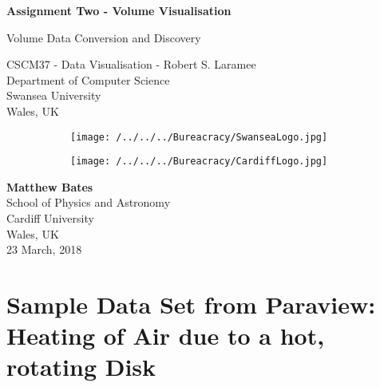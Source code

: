 \documentclass{article}
\author{Matthew Bates}
\begin{document}
\begin{titlepage}
    \begin{center}
        \vspace*{1cm}
        
	\Huge
        \textbf{Assignment Two - Volume Visualisation}
        
        \vspace{0.5cm}
	\LARGE
        Volume Data Conversion and Discovery
         \vfill

	CSCM37 - Data Visualisation - Robert S. Laramee\\
	Department of Computer Science\\
	Swansea University\\
 	Wales, UK
        \vspace{1.5cm}
	\begin{figure}[h]
    		\centering
    		\begin{subfigure}[b]{0.3\textwidth}
        		\texttt{[image: /../../../Bureacracy/SwanseaLogo.jpg]}
    		\end{subfigure}
		\begin{subfigure}[b]{0.215\textwidth}
        		\texttt{[image: /../../../Bureacracy/CardiffLogo.jpg]}
        	\end{subfigure}
	\end{figure}
        

        
        \vspace{0.8cm}
        \Large
        \textbf{Matthew Bates}\\
        School of Physics and Astronomy\\
        Cardiff University\\
        Wales, UK\\
        23 March, 2018
        
    \end{center}
\end{titlepage}


\section{Sample Data Set from Paraview: Heating of Air due to a hot, rotating Disk}
\end{document}
